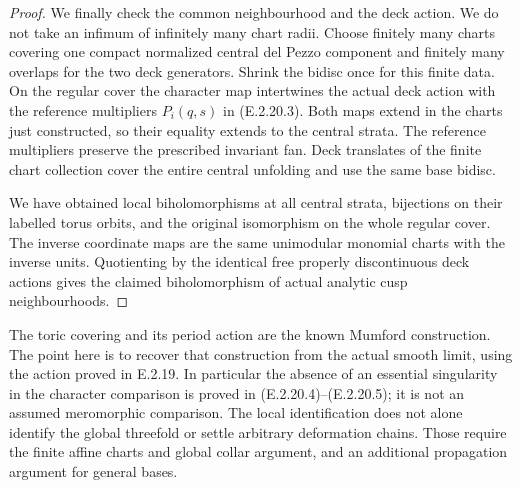 \begin{proof}
We finally check the
common neighbourhood
and the deck action.
We do not take an
infimum of infinitely
many chart radii.
Choose finitely many
charts covering one
compact normalized
central del Pezzo
component and finitely
many overlaps for
the two deck generators.
Shrink the bidisc once
for this finite data.
On the regular cover
the character map
intertwines the actual
deck action with the
reference multipliers
$P_i(q,s)$ in
(E.2.20.3).  Both maps
extend in the charts
just constructed, so
their equality extends
to the central strata.
The reference multipliers
preserve the prescribed
invariant fan.  Deck
translates of the finite
chart collection cover
the entire central
unfolding and use the
same base bidisc.

We have obtained local
biholomorphisms at all
central strata, bijections
on their labelled torus
orbits, and the original
isomorphism on the whole
regular cover.  The
inverse coordinate maps
are the same unimodular
monomial charts with
the inverse units.
Quotienting by the
identical free properly
discontinuous deck
actions gives the
claimed biholomorphism
of actual analytic
cusp neighbourhoods.
\end{proof}

\begin{remark}
The toric covering and its
period action are the known
Mumford construction.  The
point here is to recover
that construction from
the actual smooth limit,
using the action proved
in E.2.19.  In particular
the absence of an essential
singularity in the character
comparison is proved in
(E.2.20.4)--(E.2.20.5);
it is not an assumed
meromorphic comparison.
The local identification
does not alone identify
the global threefold or
settle arbitrary deformation
chains.  Those require
the finite affine charts
and global collar argument,
and an additional propagation
argument for general bases.
\end{remark}
